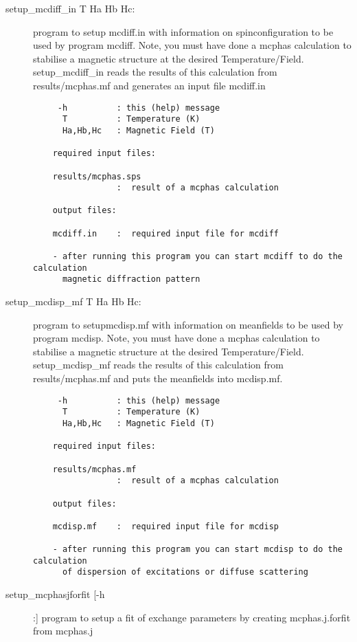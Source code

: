 \begin{description}
\item [\prg setup\_mcdiff\_in  T Ha Hb Hc:] program
 to setup {\prg mcdiff.in} with information on spinconfiguration
                    to be used by program {\prg mcdiff}. Note, you must
                    have done a {\prg mcphas} calculation to stabilise
                    a magnetic structure at the desired Temperature/Field.
                  { \prg   setup\_mcdiff\_in} reads the results of this calculation
                    from {\prg results/mcphas.mf} and generates an input file
                    {\prg mcdiff.in}

\begin{verbatim}
     -h          : this (help) message
      T          : Temperature (K)
      Ha,Hb,Hc   : Magnetic Field (T)

    required input files:

    results/mcphas.sps
                 :  result of a mcphas calculation

    output files:

    mcdiff.in    :  required input file for mcdiff

    - after running this program you can start mcdiff to do the calculation
      magnetic diffraction pattern
\end{verbatim}
\item [ \prg   setup\_mcdisp\_mf  T Ha Hb Hc:] program to setup{\prg mcdisp.mf} with information on meanfields
                    to be used by program {\prg mcdisp}. Note, you must
                    have done a {\prg mcphas} calculation to stabilise
                    a magnetic structure at the desired Temperature/Field.
                    {\prg   setup\_mcdisp\_mf} reads the results of this calculation
                    from {\prg  results/mcphas.mf} and puts the meanfields into
                    {\prg mcdisp.mf}.


\begin{verbatim}
     -h          : this (help) message
      T          : Temperature (K)
      Ha,Hb,Hc   : Magnetic Field (T)

    required input files:

    results/mcphas.mf
                 :  result of a mcphas calculation

    output files:

    mcdisp.mf    :  required input file for mcdisp

    - after running this program you can start mcdisp to do the calculation
      of dispersion of excitations or diffuse scattering
\end{verbatim}
\item[\prg   setup\_mcphasjforfit  [-h]:] program to setup a fit of exchange parameters by   creating mcphas.j.forfit from mcphas.j
                    

\end{description}
